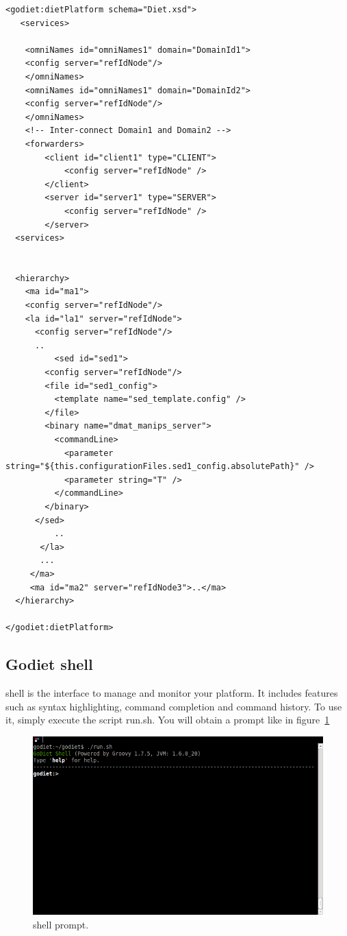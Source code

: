 \begin{verbatim}
<godiet:dietPlatform schema="Diet.xsd">
   <services>

    <omniNames id="omniNames1" domain="DomainId1">
	<config server="refIdNode"/>
    </omniNames>
    <omniNames id="omniNames1" domain="DomainId2">
	<config server="refIdNode"/>
    </omniNames>
    <!-- Inter-connect Domain1 and Domain2 -->
    <forwarders>
        <client id="client1" type="CLIENT">
            <config server="refIdNode" />
        </client>
        <server id="server1" type="SERVER">
            <config server="refIdNode" />
        </server>
  <services>


  <hierarchy>
    <ma id="ma1">
 	<config server="refIdNode"/>
	<la id="la1" server="refIdNode">
   	  <config server="refIdNode"/>          
   	  ..
          <sed id="sed1">
	    <config server="refIdNode"/>
	    <file id="sed1_config">
	      <template name="sed_template.config" />
	    </file>
	    <binary name="dmat_manips_server">
	      <commandLine>
	        <parameter string="${this.configurationFiles.sed1_config.absolutePath}" />
	        <parameter string="T" />
	      </commandLine>
	    </binary>
	  </sed>
          ..
       </la>
       ...
     </ma>
     <ma id="ma2" server="refIdNode3">..</ma>
  </hierarchy>

</godiet:dietPlatform>
\end{verbatim}


\subsection{Godiet shell}
\label{GODIETShell}

\godiet shell is the interface to manage and monitor your \diet platform. It includes features such as syntax highlighting, command completion and command history.
To use it, simply execute the script run.sh. You will obtain a prompt like in figure~\ref{fig:GODIETShell}

\begin{figure}[h]
  \centering
  \includegraphics[width=12cm]{fig/1-startup}
  \caption{\godiet shell prompt.\label{fig:GODIETShell}}
\end{figure} 

